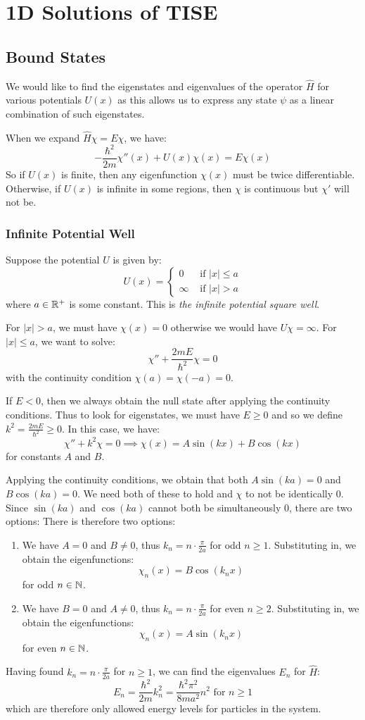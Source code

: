 \documentclass[../main.tex]{subfiles}
\begin{document}
\chapter{1D Solutions of TISE}
\section{Bound States}
We would like to find the eigenstates and eigenvalues of the operator $\hat{H}$ for various potentials $U(x)$ as this allows us to express any state $\psi$ as a linear combination of such eigenstates.

When we expand $\hat{H} \chi = E \chi$, we have:
\[
  -\frac{\hbar^2}{2m} \chi''(x) + U(x) \chi(x) = E \chi(x)
\]
So if $U(x)$ is finite, then any eigenfunction $\chi(x)$ must be twice differentiable.
Otherwise, if $U(x)$ is infinite in some regions, then $\chi$ is continuous but $\chi'$ will not be.
\subsection{Infinite Potential Well}
Suppose the potential $U$ is given by:
\[
  U(x) = \begin{cases}
  0 & \text{ if } |x| \leq a \\
  \infty & \text{ if } |x| > a
  \end{cases}
\]
where $a \in \mathbb{R}^{+}$ is some constant.
This is \textit{the infinite potential square well}.

For $|x| > a$, we must have $\chi(x) = 0$ otherwise we would have $U\chi = \infty$.
For $|x| \leq a$, we want to solve:
\[
  \chi'' + \frac{2mE}{\hbar^2} \chi = 0
\]
with the continuity condition $\chi(a) = \chi(-a) = 0$.

If $E < 0$, then we always obtain the null state after applying the continuity conditions.
Thus to look for eigenstates, we must have $E \geq 0$ and so we define $k^2 = \frac{2mE}{\hbar^2} \geq 0$.
In this case, we have:
\[
  \chi'' + k^2 \chi = 0 \implies \chi(x) = A\sin(kx) + B\cos(kx)
\]
for constants $A$ and $B$.

Applying the continuity conditions, we obtain that both $A\sin(ka) = 0$ and $B\cos(ka) = 0$.
We need both of these to hold and $\chi$ to not be identically 0.
Since $\sin(ka)$ and $\cos(ka)$ cannot both be simultaneously 0, there are two options:
There is therefore two options:
\begin{enumerate}
  \item We have $A = 0$ and $B \neq 0$, thus $k_n = n \cdot \frac{\pi}{2a}$ for odd $n \geq 1$.
    Substituting in, we obtain the eigenfunctions:
    \[
      \chi_n(x) = B \cos(k_n x)
    \]
    for odd $n \in \mathbb{N}$.
  \item We have $B = 0$ and $A \neq 0$, thus $k_n = n \cdot \frac{\pi}{2a}$ for even $n \geq 2$.
    Substituting in, we obtain the eigenfunctions:
    \[
      \chi_n(x) = A \sin(k_n x)
    \]
    for even $n \in \mathbb{N}$.
\end{enumerate}
Having found $k_n = n \cdot \frac{\pi}{2a}$ for $n \geq 1$, we can find the eigenvalues $E_n$ for $\hat{H}$:
\[
  E_n = \frac{\hbar^2}{2m} k^2_n = \frac{\hbar^2\pi^2}{8ma^2}n^2 \text{ for } n \geq 1
\]
which are therefore only allowed energy levels for particles in the system.
\end{document}
